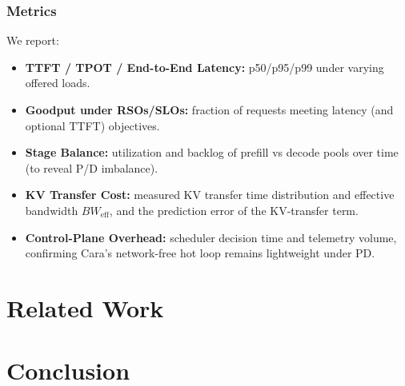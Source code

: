 \documentclass[letterpaper, anonymous, twocolumn, 10pt]{article}
\begin{document}
\subsubsection{Metrics}
We report:
\begin{itemize}
    \item \textbf{TTFT / TPOT / End-to-End Latency:} p50/p95/p99 under varying offered loads.
    \item \textbf{Goodput under RSOs/SLOs:} fraction of requests meeting latency (and optional TTFT) objectives.
    \item \textbf{Stage Balance:} utilization and backlog of prefill vs decode pools over time (to reveal P/D imbalance).
    \item \textbf{KV Transfer Cost:} measured KV transfer time distribution and effective bandwidth $BW_{\text{eff}}$, and the prediction error of the KV-transfer term.
    \item \textbf{Control-Plane Overhead:} scheduler decision time and telemetry volume, confirming Cara's network-free hot loop remains lightweight under PD.
\end{itemize}


\section{Related Work}\label{section:related_work}

\section{Conclusion}

{

}

\appendix
\end{document}
